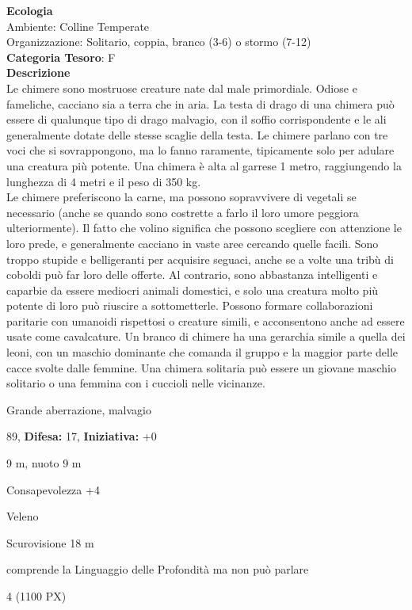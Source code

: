 \begin{multicols}{2}
{\textbf{Ecologia}\\
Ambiente: Colline Temperate\\
Organizzazione: Solitario, coppia, branco (3-6) o stormo (7-12)\\
\textbf{Categoria Tesoro}: F\\
\textbf{Descrizione}\\
Le chimere sono mostruose creature nate dal male primordiale. Odiose e fameliche, cacciano sia a terra che in aria. La testa di drago di una chimera può essere di qualunque tipo di drago malvagio, con il soffio corrispondente e le ali generalmente dotate delle stesse scaglie della testa. Le chimere parlano con tre voci che si sovrappongono, ma lo fanno raramente, tipicamente solo per adulare una creatura più potente. Una chimera è alta al garrese 1 metro, raggiungendo la lunghezza di 4 metri e il peso di 350 kg.\\
Le chimere preferiscono la carne, ma possono sopravvivere di vegetali se necessario (anche se quando sono costrette a farlo il loro umore peggiora ulteriormente). Il fatto che volino significa che possono scegliere con attenzione le loro prede, e generalmente cacciano in vaste aree cercando quelle facili. Sono troppo stupide e belligeranti per acquisire seguaci, anche se a volte una tribù di coboldi può far loro delle offerte. Al contrario, sono abbastanza intelligenti e caparbie da essere mediocri animali domestici, e solo una creatura molto più potente di loro può riuscire a sottometterle. Possono formare collaborazioni paritarie con umanoidi rispettosi o creature simili, e acconsentono anche ad essere usate come cavalcature. Un branco di chimere ha una gerarchia simile a quella dei leoni, con un maschio dominante che comanda il gruppo e la maggior parte delle cacce svolte dalle femmine. Una chimera solitaria può essere un giovane maschio solitario o una femmina con i cuccioli nelle vicinanze.

\noindent
\begin{description}[noitemsep, topsep=0pt, parsep=0pt, partopsep=0pt, leftmargin=0cm, labelwidth=2.2cm]
	\item[\textbf{Taglia/Tipo:}] Grande aberrazione, malvagio
	\item[\textbf{Caratt.:}] 
	\item[\textbf{Punti Ferita:}] 89,  \textbf{Difesa:} 17,  \textbf{Iniziativa:} +0
	\item[\textbf{Movimento:}] 9 m, nuoto 9 m
	\item[\textbf{Tiri Salvez.:}] 
	\item[\textbf{Comp.:}] Consapevolezza +4
	\item[\textbf{Imm. Danni:}] Veleno
	\item[\textbf{Sensi:}] Scurovisione 18 m
	\item[\textbf{Linguaggi:}] comprende la Linguaggio delle Profondità ma non può parlare
	\item[\textbf{Sfida:}] 4 (1100 PX)\smallskip
\end{description}

}
\end{multicols}
